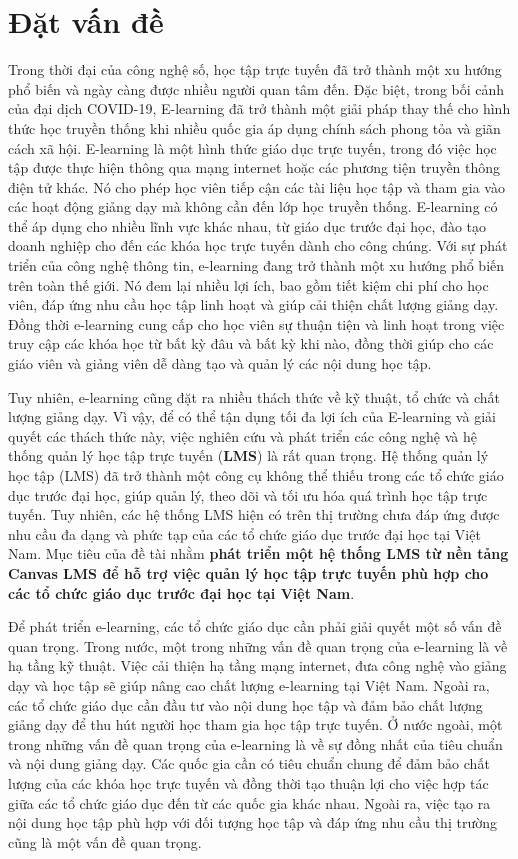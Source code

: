 \documentclass[../Thesis.tex]{subfiles}
\begin{document}
\section{Đặt vấn đề}
Trong thời đại của công nghệ số, học tập trực tuyến đã trở thành một xu hướng phổ biến và ngày càng được nhiều người quan tâm đến. Đặc biệt, trong bối cảnh của đại dịch COVID-19, 
E-learning đã trở thành một giải pháp thay thế cho hình thức học truyền thống khi nhiều quốc gia áp dụng chính sách phong tỏa và giãn cách xã hội. 
E-learning là một hình thức giáo dục trực tuyến, trong đó việc học tập được thực hiện thông qua mạng internet hoặc các phương tiện truyền thông điện tử khác. Nó cho phép học viên tiếp cận các tài liệu học tập và tham gia vào các hoạt động giảng dạy mà không cần đến lớp học truyền thống. E-learning có thể áp dụng cho nhiều lĩnh vực khác nhau, từ giáo dục trước đại học, đào tạo doanh nghiệp cho đến các khóa học trực tuyến dành cho công chúng.
Với sự phát triển của công nghệ thông tin, e-learning đang trở thành một xu hướng phổ biến trên toàn thế giới. Nó đem lại nhiều lợi ích, bao gồm tiết kiệm chi phí cho học viên, đáp ứng nhu cầu học tập linh hoạt và giúp cải thiện chất lượng giảng dạy.
Đồng thời e-learning cung cấp cho học viên sự thuận tiện và linh hoạt trong việc truy cập các khóa học từ bất kỳ đâu và bất kỳ khi nào, đồng thời giúp cho các giáo viên và giảng viên dễ dàng tạo và quản lý các nội dung học tập. 

Tuy nhiên, e-learning cũng đặt ra nhiều thách thức về kỹ thuật, tổ chức và chất lượng giảng dạy. Vì vậy, để có thể tận dụng tối đa lợi ích của E-learning và giải quyết các thách thức này, 
việc nghiên cứu và phát triển các công nghệ và hệ thống quản lý học tập trực tuyến (\textbf{LMS}) là rất quan trọng. 
Hệ thống quản lý học tập (LMS) đã trở thành một công cụ không thể thiếu trong các tổ chức giáo dục trước đại học, giúp quản lý, theo dõi và tối ưu hóa quá trình học tập trực tuyến. Tuy nhiên, các hệ thống LMS hiện có trên thị trường chưa đáp ứng được nhu cầu đa dạng và phức tạp của các tổ chức giáo dục trước đại học tại Việt Nam.
Mục tiêu của đề tài nhằm \textbf{phát triển một hệ thống LMS từ nền tảng Canvas LMS để hỗ trợ việc quản lý học tập trực tuyến phù hợp cho các tổ chức giáo dục trước đại học tại Việt Nam}.

Để phát triển e-learning, các tổ chức giáo dục cần phải giải quyết một số vấn đề quan trọng.
Trong nước, một trong những vấn đề quan trọng của e-learning là về hạ tầng kỹ thuật. Việc cải thiện hạ tầng mạng internet, đưa công nghệ vào giảng dạy và học tập sẽ giúp nâng cao chất lượng e-learning tại Việt Nam. Ngoài ra, các tổ chức giáo dục cần đầu tư vào nội dung học tập và đảm bảo chất lượng giảng dạy để thu hút người học tham gia học tập trực tuyến.
Ở nước ngoài, một trong những vấn đề quan trọng của e-learning là về sự đồng nhất của tiêu chuẩn và nội dung giảng dạy. Các quốc gia cần có tiêu chuẩn chung để đảm bảo chất lượng của các khóa học trực tuyến và đồng thời tạo thuận lợi cho việc hợp tác giữa các tổ chức giáo dục đến từ các quốc gia khác nhau. Ngoài ra, việc tạo ra nội dung học tập phù hợp với đối tượng học tập và đáp ứng nhu cầu thị trường cũng là một vấn đề quan trọng.
\end{document}
